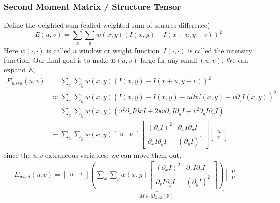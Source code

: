 \documentclass[11pt]{article}
\newcommand{\R}{\mathbb{R}}
\newcommand{\mat}[2]{M_{#1 \times #2}(\R)}
\begin{document}
\subsubsection{Second Moment Matrix / Structure Tensor}
Define the weighted sum (called weighted sum of squares difference)
\begin{equation}
	E(u, v) = \sum_x \sum_y w(x, y)\left( I(x, y) - I(x + u, y + v) \right)^2
\end{equation}
Here $w(\cdot, \cdot)$ is called a window or weight function, $I(\cdot, \cdot)$ is called the intensity function. Our final goal is to make $E(u, v)$ large for any small $(u, v)$. We can expand $E$,
\begin{align}
	E_{wssd}(u, v) 
	&= \sum_x\sum_y w(x, y) \left( I(x, y) - I(x + u, y + v) \right)^2 \\
	&\approx \sum_x\sum_y w(x, y) \left( I(x, y) - I(x, y) - u\partial x I(x, y) - v\partial_y I(x,y) \right)^2 \\
	&= \sum_x \sum_y w(x, y) (u^2 \partial_x I \partial x I + 2uv \partial_xI \partial_yI + v^2 \partial_y I \partial_y I) \\
	&= \sum_x \sum_y w(x, y) \begin{bmatrix}
		u & v
	\end{bmatrix}\begin{bmatrix}
		(\partial_x I )^2 & \partial_x I \partial_y I \\
		\partial_x I \partial_y I & (\partial_y I )^2 
	\end{bmatrix}\begin{bmatrix}
		u \\ v 
	\end{bmatrix}
\end{align}
since the $u, v$ extraneous variables, we can move them out, 
\begin{align}
	E_{wssd}(u, v) = \begin{bmatrix}
		u & v
	\end{bmatrix} \underbrace{\left( \sum_x \sum_y w(x, y)\begin{bmatrix}
		(\partial_x I )^2 & \partial_x I \partial_y I \\
		\partial_x I \partial_y I & (\partial_y I )^2 
	\end{bmatrix}\right)}_{M\in\mat{2}{2}}  \begin{bmatrix}
		u \\ v 
	\end{bmatrix}
\end{align} 
\end{document}
